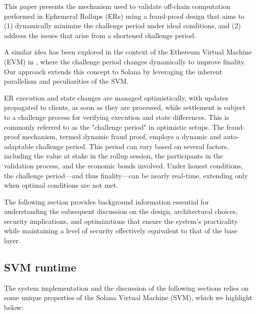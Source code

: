 \documentclass{article}
\begin{document}
This paper presents the mechanism used to validate off-chain computation performed in Ephemeral Rollups (ERs) using a fraud-proof design that aims to (1) dynamically minimize the challenge period under ideal conditions, and (2) address the issues that arise from a shortened challenge period. 

A similar idea has been explored in the context of the Ethereum Virtual Machine (EVM) in \cite{wweek}, where the challenge period changes dynamically to improve finality. Our approach extends this concept to Solana by leveraging the inherent parallelism and peculiarities of the SVM. 

ER execution and state changes are managed optimistically, with updates propagated to clients, as soon as they are processed, while settlement is subject to a challenge process for verifying execution and state differences. This is commonly referred to as the "challenge period" in optimistic setups. The fraud-proof mechanism, termed dynamic fraud proof, employs a dynamic and auto-adaptable challenge period. This period can vary based on several factors, including the value at stake in the rollup session, the participants in the validation process, and the economic bonds involved. Under honest conditions, the challenge period—and thus finality—can be nearly real-time, extending only when optimal conditions are not met.

The following section provides background information essential for understanding the subsequent discussion on the design, architectural choices, security implications, and optimizations that ensure the system's practicality while maintaining a level of security effectively equivalent to that of the base layer.

\cite{wweek}

\subsection{SVM runtime}
\label{ss:svm-runtime}

The system implementation and the discussion of the following sections relies on some unique properties of the Solana Virtual Machine (SVM), which we highlight below:
\end{document}
